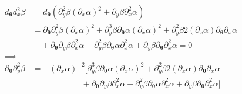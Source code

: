 \begin{align}
    d_{\bm \theta} d^2_{x} \beta 
    &= d_{\bm \theta} \left( 
        \partial_{y}^{2} \beta \left(\partial_{x} \alpha \right)^2 
        + \partial_{y} \beta \partial_{x}^{2} \alpha 
    \right) \\
    &= 
        \partial_{\bm \theta} \partial_{y}^{2} \beta \left(\partial_{x} \alpha \right)^2 
        + \partial_{y}^{3} \beta  \partial_{\bm \theta} \alpha \left(\partial_{x} \alpha \right)^2 
        + \partial_{y}^{2} \beta 2 \left(\partial_{x} \alpha \right) \partial_{\bm \theta} \partial_{x} \alpha
        \\ &\quad
        + \partial_{\bm \theta} \partial_{y} \beta \partial_{x}^{2} \alpha 
        + \partial^2_{y} \beta \partial_{\bm \theta} \alpha \partial_{x}^{2} \alpha 
        + \partial_{y} \beta \partial_{\bm \theta} \partial_{x}^{2} \alpha = 0
     \\
    \implies&\\
    \partial_{\bm \theta} \partial_{y}^{2} \beta &= - \left(\partial_{x} \alpha \right)^{-2} \Bigg[ 
        \partial_{y}^{3} \beta  \partial_{\bm \theta} \alpha \left(\partial_{x} \alpha \right)^2 
        + \partial_{y}^{2} \beta 2 \left(\partial_{x} \alpha \right) \partial_{\bm \theta} \partial_{x} \alpha
        \\ &\qquad\qquad\qquad
        + \partial_{\bm \theta} \partial_{y} \beta \partial_{x}^{2} \alpha 
        + \partial^2_{y} \beta \partial_{\bm \theta} \alpha \partial_{x}^{2} \alpha 
        + \partial_{y} \beta \partial_{\bm \theta} \partial_{x}^{2} \alpha
    \Bigg] 
\end{align}